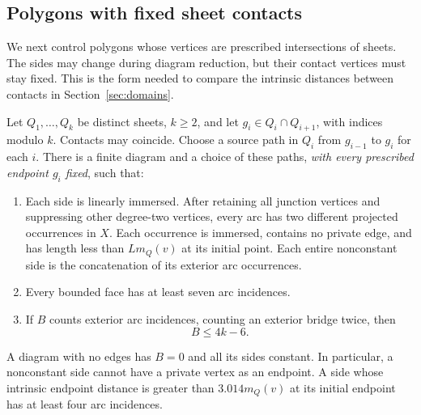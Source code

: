 \subsection{Polygons with fixed sheet contacts}

We next control polygons whose vertices are prescribed intersections of
sheets.  The sides may change during diagram reduction, but their contact
vertices must stay fixed.  This is the form needed to compare the intrinsic
distances between contacts in Section~\ref{sec:domains}.

\begin{lemma}\label{lem:sheet-polygon}
Let $Q_1,\ldots,Q_k$ be distinct sheets, $k\ge2$, and let
$g_i\in Q_i\cap Q_{i+1}$, with indices modulo $k$.  Contacts may
coincide.  Choose a source path in $Q_i$ from $g_{i-1}$ to $g_i$ for
each $i$.  There is a finite diagram and a choice of these paths,
\emph{with every prescribed endpoint $g_i$ fixed}, such that:
\begin{enumerate}
\item Each side is linearly immersed.  After retaining all junction
 vertices and suppressing other degree-two vertices, every arc has two
 different projected occurrences in $X$.  Each occurrence is immersed,
 contains no private edge, and has length less than $Lm_Q(v)$ at its
 initial point.  Each entire nonconstant side is the concatenation of
 its exterior arc occurrences.
\item Every bounded face has at least seven arc incidences.
\item If $B$ counts exterior arc incidences, counting an exterior bridge
 twice, then
 \begin{equation}\label{eq:polygon-exterior}
 B\le4k-6.
 \end{equation}
\end{enumerate}
A diagram with no edges has $B=0$ and all its sides constant.
In particular, a nonconstant side cannot have a private vertex as an
endpoint.  A side whose intrinsic endpoint distance is greater than
$3.014m_Q(v)$ at its initial endpoint has at least four arc incidences.
\end{lemma}


